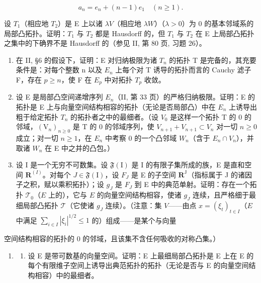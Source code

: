 \[
a _ {n} = e _ {n} + (n - 1) e _ {1} \quad (n \geqslant 1).
\]

设 \(T_{1}\)（相应地 \(T_{2}\)）是 E 上以诸 \(\lambda V\)（相应地 \(\lambda W\)）（\(\lambda > 0\)）为 0 的基本邻域系的局部凸拓扑。证明：\(T_{1}\) 与 \(T_{2}\) 都是 Hausdorff 的，但 \(T_{1}\) 与 \(T_{2}\) 在 E 上局部凸拓扑之集中的下确界不是 Hausdorff 的（参见 II, 第 80 页, 习题 26）。

\begin{enumerate}
\def\labelenumi{\arabic{enumi})}
\setcounter{enumi}{12}
\item
  在 II, §6 的假设下，证明：E 对归纳极限为诸 \(T_{n}\) 的拓扑 T 是完备的，其充要条件是：对每个整数 n 以及 \(E_{n}\) 上每个对 T 诱导的拓扑而言的 Cauchy 滤子 F，存在 \(p \geqslant n\)，使 F 在 \(E_{p}\) 中对拓扑 \(T_{p}\) 收敛。
\item
  设 E 是局部凸空间递增序列 \(E_{n}\)（II, 第 33 页）的严格归纳极限。证明：E 的拓扑是 E 上与向量空间结构相容的拓扑（无论是否局部凸）中在 \(E_{n}\) 上诱导出粗于给定拓扑 \(T_{n}\) 的拓扑者之中的最细者。（设 \(V_{0}\) 是这样一个拓扑 T 的 0 的邻域，\((\mathrm{V}_{n})_{n\geqslant0}\) 是 T 的 0 的邻域序列，使 \(V_{n+1} + V_{n+1} \subset V_{n}\) 对一切 \(n \geqslant 0\) 成立；对一切 \(n \geqslant 1\)，在 \(E_{n}\) 中考察 0 的一个凸邻域 \(W_{n}\)（含于 \(E_{n} \cap V_{n}\)），并取诸 \(W_{n}\) 在 E 中之并的凸包。）
\item
  设 I 是一个无穷不可数集。设 \(\mathfrak{F}(\mathrm{I})\) 是 I 的有限子集所成的族，E 是直和空间 \(\mathbf{R}^{(I)}\)。对每个 \(J \in \mathfrak{F}(\mathrm{I})\)，设 \(F_{J}\) 是 E 的子空间 \(\mathbf{R}^{\mathrm{J}}\)（指标属于 J 的诸因子之积，赋以乘积拓扑）；设 \(g_{J}\) 是 \(F_{J}\) 到 E 中的典范单射。证明：存在一个拓扑 \(\mathcal{T}_0\)（\(E\) 上的），它与 \(E\) 的向量空间结构相容，使诸 \(g_{J}\) 连续，且严格细于最细局部凸拓扑 \(\mathcal{T}\)（它使诸 \(g_{J}\) 连续）。（注意：集 \(V\)——由点 \(x = (\xi_{t})_{t\in I}\)（\(E\) 中满足 \(\sum_{i\in I}|\xi_i|^{1 / 2}\leqslant 1\) 的）组成——是某个与向量
\end{enumerate}

空间结构相容的拓扑的 0 的邻域，且该集不含任何吸收的对称凸集。）

\begin{enumerate}
\def\labelenumi{\arabic{enumi})}
\setcounter{enumi}{15}
\tightlist
\item
  \begin{enumerate}
  \def\labelenumii{\alph{enumii})}
  \tightlist
  \item
    设 E 是带可数基的向量空间。证明：E 上最细局部凸拓扑是 E 上在 E 的每个有限维子空间上诱导出典范拓扑的拓扑（无论是否与 E 的向量空间结构相容）中的最细者。
  \end{enumerate}
\end{enumerate}

